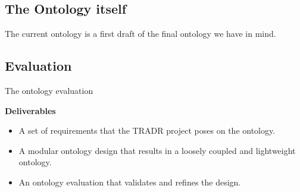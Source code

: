 \subsection{The Ontology itself}

The current ontology is a first draft of the final ontology we have in mind.  

\subsection{Evaluation}
The ontology evaluation


\textbf{Deliverables}
\begin{itemize}
\item A set of requirements that the TRADR project poses on the ontology.
\item A modular ontology design that results in a loosely coupled and lightweight ontology.
\item An ontology evaluation that validates and refines the design.
\end{itemize}

  
  